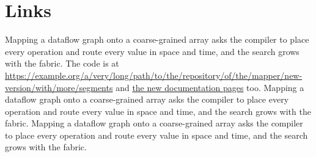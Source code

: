 \documentclass[twocolumn]{article}
\begin{document}
\section{Links}
Mapping a dataflow graph onto a coarse-grained array asks the compiler to place every operation and route every value in space and time, and the search grows with the fabric. The code is at \url{https://example.org/a/very/long/path/to/the/repository/of/the/mapper/new-version/with/more/segments} and \href{https://example.org/docs/v2}{the new documentation pages} too. Mapping a dataflow graph onto a coarse-grained array asks the compiler to place every operation and route every value in space and time, and the search grows with the fabric. Mapping a dataflow graph onto a coarse-grained array asks the compiler to place every operation and route every value in space and time, and the search grows with the fabric.
\end{document}
